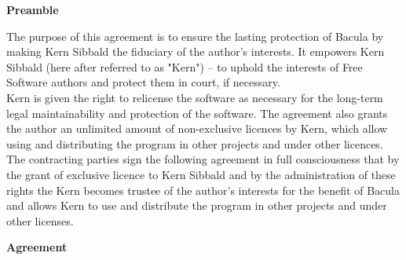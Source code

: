 
\begin{center}
{\Large\bf Preamble}
\end{center}
 
The purpose of this agreement is to ensure the lasting protection of
Bacula by making Kern Sibbald the fiduciary of the author's interests.
It empowers Kern Sibbald (here after referred to as "Kern") -- to uphold the
interests of Free Software authors and protect them in court, if
necessary.\\

Kern is given the right to relicense the software as necessary for the
long-term legal maintainability and protection of the software. The
agreement also grants the author an unlimited amount of non-exclusive
licences by Kern, which allow using and distributing the program in
other projects and under other licences. \\

The contracting parties sign the following agreement in full
consciousness that by the grant of exclusive licence to Kern Sibbald
and by the administration of these
rights the Kern becomes trustee of the author's interests for
the benefit of Bacula and allows Kern to use and distribute the
program in other projects and under other licenses. \\

\pagebreak
\begin{center}
{\Large\bf Agreement}
\end{center}

